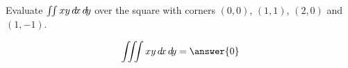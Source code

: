 \documentclass{ximera}
\author{David Guichard \and Neal Koblitz \and H. Jerome Keisler \and Albert Scheller \and Barry Balof \and Mike Wills \and Matthew Carr}
\begin{document}
\begin{exercise}




Evaluate $\iint xy \mathop{}\!d\! x \mathop{}\!d\! y$ over the square with corners $(0,0)$, $(1,1)$, $(2,0)$ and $(1,-1)$.

\begin{prompt}
\[
\iiint xy \d x \d y=\answer{0}
\]
\end{prompt}



\end{exercise}
\end{document}
